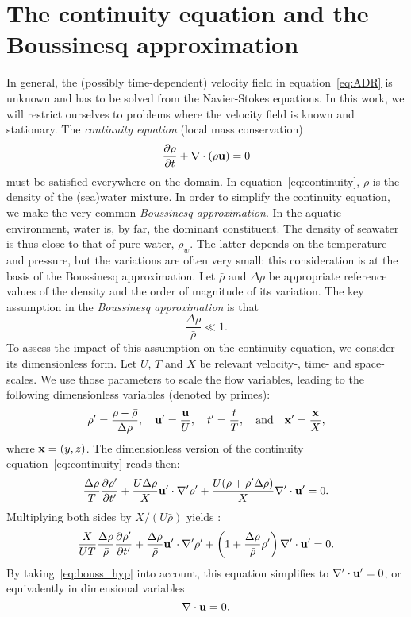 \section{The continuity equation and the Boussinesq approximation}
In general, the (possibly time-dependent) velocity field in equation~\eqref{eq:ADR} is unknown and has to be solved from the Navier-Stokes equations. In this work, we will restrict ourselves to problems where the velocity field is known and stationary. The \textit{continuity equation} (local mass conservation)
\begin{equation} \label{eq:continuity}
	\frac{\partial \rho}{\partial t} + \nabla \cdot (\rho \mathbf u) = 0
\end{equation}
must be satisfied everywhere on the domain. In equation~\eqref{eq:continuity}, $\rho$ is the density of the (sea)water mixture. In order to simplify the continuity equation, we make the very common \textit{Boussinesq approximation}. In the aquatic environment, water is, by far, the dominant constituent. The density of seawater is thus close to that of pure water, $\rho_w$. The latter depends on the temperature and pressure, but the variations are often very small: this consideration is at the basis of the Boussinesq approximation. Let $\bar{\rho}$ and $\Delta\rho$ be appropriate reference values of the density and the order of magnitude of its variation. The key assumption in the \textit{Boussinesq approximation} is that
\begin{equation} \label{eq:bouss_hyp}
	\frac{\Delta \rho}{\bar{\rho}} \ll 1.
\end{equation}
To assess the impact of this assumption on the continuity equation, we consider its dimensionless form. Let $U$, $T$ and $X$ be relevant velocity-, time- and space-scales. We use those parameters to scale the flow variables, leading to the following dimensionless variables (denoted by primes):
\begin{equation}
	\rho' = \frac{\rho - \bar{\rho}}{\Delta \rho}, \quad \mathbf u' = \frac{\mathbf u}{U}, \quad t' = \frac{t}{T}, \quad \mbox{and} \quad \mathbf x' = \frac{\mathbf x}{X},
\end{equation}
where $\mathbf x = (y,z)$. The dimensionless version of the continuity equation~\eqref{eq:continuity} reads then: 
\begin{equation}
	\frac{\Delta \rho}{T}\frac{\partial \rho'}{\partial t'} + \frac{U\Delta \rho}{X}\mathbf u' \cdot \nabla' \rho' + \frac{U(\bar{\rho}+ \rho' \Delta \rho)}{X}\nabla' \cdot \mathbf u' = 0.
\end{equation}
Multiplying both sides by $X/(U\bar{\rho})$ yields :
\begin{equation}
	\frac{X}{UT}\frac{\Delta \rho}{\bar{\rho}}\frac{\partial \rho'}{\partial t'} + \frac{\Delta \rho}{\bar{\rho}}\mathbf u' \cdot \nabla' \rho' + \left(1+\frac{\Delta \rho}{\bar{\rho}}\rho'\right)\nabla' \cdot \mathbf u' = 0.
\end{equation}
By taking~\eqref{eq:bouss_hyp} into account, this equation simplifies to $\nabla' \cdot \mathbf u' = 0$, or equivalently in dimensional variables 
\begin{equation}
	\nabla \cdot \mathbf u = 0.
\end{equation}

